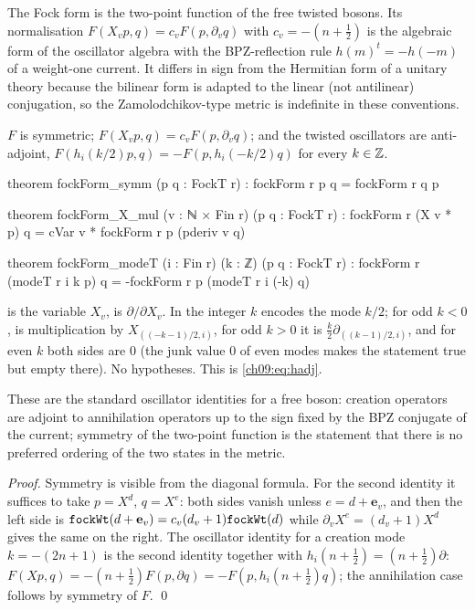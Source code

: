 \begin{physics}
The Fock form is the two-point function of the free twisted bosons. Its normalisation $F(X_vp,q)=c_vF(p,\partial_vq)$ with $c_v=-(n+\frac12)$ is the algebraic form of the oscillator algebra with the BPZ-reflection rule $h(m)^t=-h(-m)$ of a weight-one current. It differs in sign from the Hermitian form of a unitary theory because the bilinear form is adapted to the linear (not antilinear) conjugation, so the Zamolodchikov-type metric is indefinite in these conventions.
\end{physics}

\begin{theorem}\label{ch09:thm:fockbasic}
$F$ is symmetric; $F(X_vp,q)=c_vF(p,\partial_vq)$; and the twisted oscillators are anti-adjoint,
$F(h_i(k/2)p,q)=-F(p,h_i(-k/2)q)$ for every $k\in{\mathbb{Z}}$.
\end{theorem}
\begin{leancode}
theorem fockForm_symm (p q : FockT r) : fockForm r p q = fockForm r q p

theorem fockForm_X_mul (v : ℕ × Fin r) (p q : FockT r) :
    fockForm r (X v * p) q = cVar v * fockForm r p (pderiv v q)

theorem fockForm_modeT (i : Fin r) (k : ℤ) (p q : FockT r) :
    fockForm r (modeT r i k p) q = -fockForm r p (modeT r i (-k) q)
\end{leancode}
\begin{dictionary}
 is the variable $X_v$,  is $\partial/\partial X_v$. In
 the integer $k$ encodes the mode $k/2$; for odd $k<0$, 
is multiplication by $X_{((-k-1)/2,i)}$, for odd $k>0$ it is $\tfrac k2\partial_{((k-1)/2,i)}$,
and for even $k$ both sides are $0$ (the junk value $0$ of even modes makes the statement true but
empty there). No hypotheses. This is \eqref{ch09:eq:hadj}.
\end{dictionary}
\begin{physics}
These are the standard oscillator identities for a free boson: creation operators are adjoint to annihilation operators up to the sign fixed by the BPZ conjugate of the current; symmetry of the two-point function is the statement that there is no preferred ordering of the two states in the metric.
\end{physics}

\noindent\emph{Proof.} Symmetry is visible from the diagonal formula. For the second identity it
suffices to take $p=X^d$, $q=X^e$: both sides vanish unless $e=d+\mathbf e_v$, and then the left
side is $\lean{fockWt}(d+\mathbf e_v)=c_v(d_v+1)\lean{fockWt}(d)$ while $\partial_vX^e=(d_v+1)X^d$
gives the same on the right. The oscillator identity for a creation mode $k=-(2n+1)$ is the second
identity together with $h_i(n+\tfrac12)=(n+\tfrac12)\partial$: $F(Xp,q)=-(n+\tfrac12)F(p,\partial q)=-F(p,h_i(n+\tfrac12)q)$;
the annihilation case follows by symmetry of $F$. \qed

